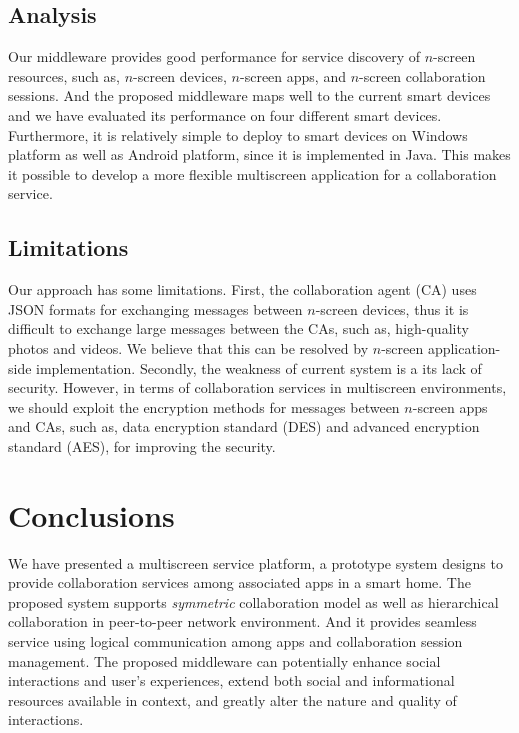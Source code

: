 \documentclass[conference]{IEEEtran}
\begin{document}
\subsection{Analysis} 
Our middleware provides good performance for service discovery of $n$-screen resources, such as, $n$-screen devices, $n$-screen apps, and $n$-screen collaboration sessions.
    And the proposed middleware maps well to the current smart devices and we have evaluated its performance on four different smart devices.
    Furthermore, it is relatively simple to deploy to smart devices on Windows platform as well as Android platform, since it is implemented in Java.
This makes it possible to develop a more flexible multiscreen application for a collaboration service. \\


\subsection{Limitations}
    Our approach has some limitations.
    First, the collaboration agent (CA) uses JSON formats for exchanging messages between $n$-screen devices, thus it is difficult to exchange large messages between the CAs, such as, high-quality photos and videos.  We believe that this can be resolved by $n$-screen application-side implementation.
  Secondly, the weakness of current system is a its lack of security.
  However, in terms of collaboration services in multiscreen environments, we should exploit the encryption methods for messages between $n$-screen apps and CAs, such as, data encryption standard (DES) and advanced encryption standard (AES), for improving the security.


\section{Conclusions}
    \label{sc:Conclusion}
We have presented a multiscreen service platform, a prototype system designs to provide collaboration services among associated apps in a smart home. 
The proposed system supports \textit{symmetric} collaboration model as well as hierarchical collaboration in peer-to-peer network environment.
And it provides seamless service using logical communication among apps and
collaboration session management.
The proposed middleware can potentially enhance social interactions and user's experiences, extend both social and informational resources available in context, and greatly alter the nature and quality of interactions.
\end{document}
